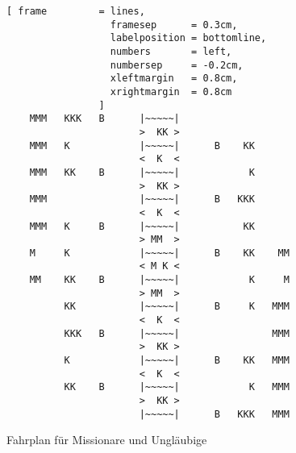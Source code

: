 \begin{figure}[!h]
  \centering
\begin{Verbatim}[ frame         = lines, 
                  framesep      = 0.3cm, 
                  labelposition = bottomline,
                  numbers       = left,
                  numbersep     = -0.2cm,
                  xleftmargin   = 0.8cm,
                  xrightmargin  = 0.8cm
                ]
    MMM   KKK   B      |~~~~~|                   
                       >  KK >
    MMM   K            |~~~~~|      B    KK      
                       <  K  <
    MMM   KK    B      |~~~~~|            K      
                       >  KK >
    MMM                |~~~~~|      B   KKK      
                       <  K  <
    MMM   K     B      |~~~~~|           KK      
                       > MM  >
    M     K            |~~~~~|      B    KK    MM
                       < M K <
    MM    KK    B      |~~~~~|            K     M
                       > MM  >
          KK           |~~~~~|      B     K   MMM
                       <  K  <
          KKK   B      |~~~~~|                MMM
                       >  KK >
          K            |~~~~~|      B    KK   MMM
                       <  K  <
          KK    B      |~~~~~|            K   MMM
                       >  KK >
                       |~~~~~|      B   KKK   MMM
\end{Verbatim}
\vspace*{-0.3cm}
  \caption{Fahrplan für Missionare und Ungläubige}
  \label{fig:missionare-solution}
\end{figure}      

